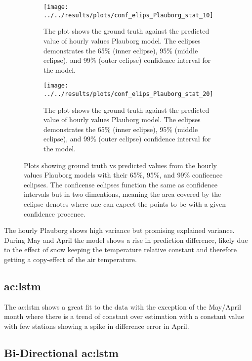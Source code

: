 \begin{figure}
	\begin{subfigure}{0.6\linewidth}
		\centering
		\texttt{[image: ../../results/plots/conf\_elips\_Plauborg\_stat\_10]}
		\caption[Confidence eclipse of hourly values Plauborg model 10cm]{The plot shows the ground truth against the predicted value of hourly values Plauborg model. The eclipses demonstrates the 65\% (inner eclipse), 95\% (middle eclipse), and 99\% (outer eclipse) confidence interval for the model.}
		\label{fig:confelipsplauborgstat10}
	\end{subfigure}
	\hfill
	\begin{subfigure}{0.6\textwidth}
		\centering
		\texttt{[image: ../../results/plots/conf\_elips\_Plauborg\_stat\_20]}
		\caption[Confidence eclipse of hourly values Plauborg model 20cm]{The plot shows the ground truth against the predicted value of hourly values Plauborg model. The eclipses demonstrates the 65\% (inner eclipse), 95\% (middle eclipse), and 99\% (outer eclipse) confidence interval for the model.}
		\label{fig:confelipsplauborgstat20}
	\end{subfigure}
	\caption{Plots showing ground truth vs predicted values from the hourly values Plauborg models with their 65\%, 95\%, and 99\% conficence eclipses. The conficense eclipses function the same as confidence intervals but in two dimentions, meaning the area covered by the eclipse denotes where one can expect the points to be with a given confidence procence.}
\end{figure}

The hourly Plauborg shows high variance but promising explained variance. During May and April the model shows a rise in prediction difference, likely due to the effect of snow keeping the temperature relative constant and therefore getting a copy-effect of the air temperature.

\subsection{\acrfull{ac:lstm}}

The \acrshort{ac:lstm} shows a great fit to the data with the exception of the May/April month where there is a trend of constant over estimation with a constant value with few stations showing a spike in difference error in April.

\subsection{Bi-Directional \acrfull{ac:lstm}}

